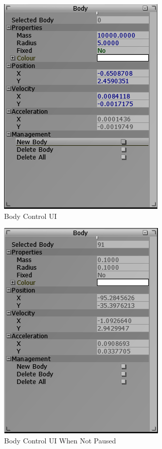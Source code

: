 {\begin{figure}[h]
  \centering
  \includegraphics[scale=0.6]{../img/bodyUI.png} 
  \caption{Body Control UI}
\end{figure}

\begin{figure}[h]
  \centering
  \includegraphics[scale=0.6]{../img/ro.png} 
  \caption{Body Control UI When Not Paused}
\end{figure}

}

